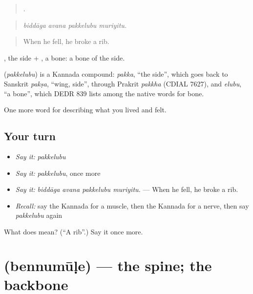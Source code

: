 \begin{quote}
   .
\end{quote}

\begin{quote}
\emph{biddāga avana pakkelubu muriyitu.}
\end{quote}

\begin{quote}
When he fell, he broke a rib.
\end{quote}

, the side + , a bone: a bone of the side.

\begin{cousinweb}
\textbf{} (\emph{pakkelubu}) is a Kannada compound: \emph{pakka}, \textquotedblleft{}the side\textquotedblright{}, which goes back to Sanskrit \emph{pakṣa}, \textquotedblleft{}wing, side\textquotedblright{}, through Prakrit \emph{pakkha} (CDIAL 7627), and \emph{elubu}, \textquotedblleft{}a bone\textquotedblright{}, which DEDR 839 lists among the native words for bone.
\end{cousinweb}

\begin{grammarlens}[title={What you've built}]
One more word for describing what you lived and felt.
\end{grammarlens}

\subsection*{Your turn}
\begin{itemize}
\raggedright
  \item \emph{Say it:} \emph{pakkelubu}
  \item \emph{Say it:} \emph{pakkelubu}, once more
  \item \emph{Say it:} \emph{biddāga avana pakkelubu muriyitu.} — When he fell, he broke a rib.
  \item \emph{Recall:} say the Kannada for a muscle, then the Kannada for a nerve, then say \emph{pakkelubu} again
\end{itemize}

\begin{tcolorbox}[breakable,colback=teal!4,colframe=teal!35!black,title={Before you move on}]
What does  mean? (\textquotedblleft{}A rib\textquotedblright{}.) Say it once more.
\end{tcolorbox}
\section[\texorpdfstring{\kn{ಬೆನ್ನುಮೂಳೆ} (bennumūḷe)}{ಬೆನ್ನುಮೂಳೆ (bennumūḷe)}]{ (bennumūḷe) — the spine; the backbone}

